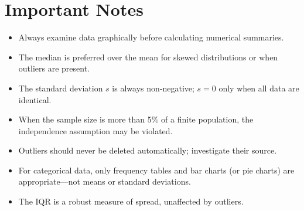 \documentclass[11pt]{article}
\begin{document}
\section*{Important Notes}
\begin{itemize}[nosep]
    \item Always examine data graphically before calculating numerical summaries.
    \item The median is preferred over the mean for skewed distributions or when outliers are present.
    \item The standard deviation \(s\) is always non‑negative; \(s=0\) only when all data are identical.
    \item When the sample size is more than 5\% of a finite population, the independence assumption may be violated.
    \item Outliers should never be deleted automatically; investigate their source.
    \item For categorical data, only frequency tables and bar charts (or pie charts) are appropriate—not means or standard deviations.
    \item The IQR is a robust measure of spread, unaffected by outliers.
\end{itemize}
\end{document}
